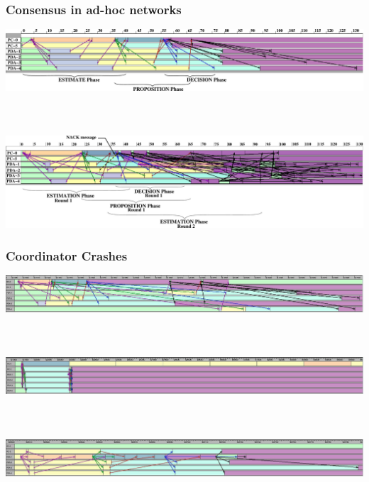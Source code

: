 \begin{frame}
\frametitle{Consensus in ad-hoc networks}
\includegraphics[width=\textwidth]{figures/Consensus1.pdf}
~\\
~\\
~\\
\pause
\includegraphics[width=\textwidth]{figures/Consensus2.pdf}

\end{frame}


\begin{frame}
\frametitle{Coordinator Crashes}

\includegraphics[width=\textwidth]{figures/trace3a.pdf}
~\\
~\\
~\\
\includegraphics[width=\textwidth]{figures/trace3b.pdf}
~\\
~\\
~\\
\includegraphics[width=\textwidth]{figures/trace3c.pdf}
\end{frame}

